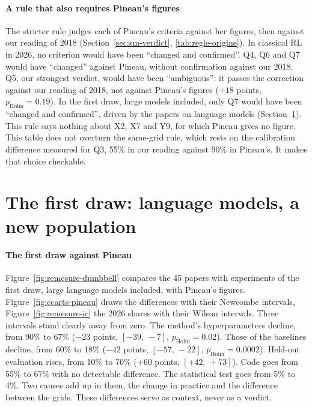 \paragraph{A rule that also requires Pineau's figures}
The stricter rule judges each of Pineau's criteria against her figures, then against our reading of
2018 (Section~\ref{sec:sm-verdict}, \cref{tab:regle-origine}). In classical RL in 2026, no criterion would have been \enquote{changed and
confirmed}. Q4, Q6 and Q7 would have \enquote{changed} against Pineau, without confirmation against our 2018.
Q5, our strongest verdict, would have been \enquote{ambiguous}: it passes the correction against our reading of
2018, not against Pineau's figures ($+18$ points, $p_{\text{Holm}} = 0.19$). In the first draw, large models
included, only Q7 would have been \enquote{changed and confirmed}, driven by the papers on language models
(Section~\ref{sec:sr-premier}). This rule says nothing about X2, X7 and Y9, for which Pineau gives no
figure. This table does not overturn the same-grid rule, which rests on the calibration difference measured
for Q3, 55\% in our reading against 90\% in Pineau's. It makes that choice checkable.


\section{The first draw: language models, a new population}\label{sec:sr-premier}

\paragraph{The first draw against Pineau}
Figure~\ref{fig:remesure-dumbbell} compares the 45 papers with experiments of the first draw, large
language models included, with Pineau's figures. Figure~\ref{fig:ecarts-pineau} draws the differences with
their Newcombe intervals, Figure~\ref{fig:remesure-ic} the 2026 shares with their Wilson intervals.
Three intervals stand clearly away from zero. The method's hyperparameters decline, from 90\% to 67\%
($-23$ points, $[-39,\,-7]$, $p_{\text{Holm}} = 0.02$). Those of the baselines decline, from 60\% to
18\% ($-42$ points, $[-57,\,-22]$, $p_{\text{Holm}} = 0.0002$). Held-out evaluation rises, from 10\% to
70\% ($+60$ points, $[+42,\,+73]$). Code goes from 55\% to 67\% with no detectable difference. The statistical
test goes from 5\% to 4\%. Two causes add up in them, the change in practice and the difference between the grids.
These differences serve as context, never as a verdict.

